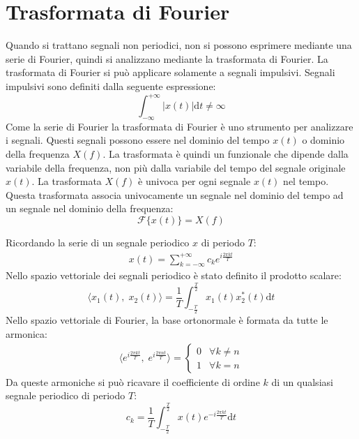 \documentclass{article}
\newcommand{\df}{\mathrm{d}}
\numberwithin{equation}{subsection}
\begin{document}
\section{Trasformata di Fourier}
Quando si trattano segnali non periodici, non si possono esprimere mediante una serie di Fourier, quindi si analizzano mediante la trasformata di Fourier. 
La trasformata di Fourier si può applicare solamente a segnali impulsivi. Segnali impulsivi sono definiti dalla seguente espressione:
\begin{equation*}
    \displaystyle\int_{-\infty}^{+\infty}|x(t)|\df t\neq\infty
\end{equation*}
Come la serie di Fourier la trasformata di Fourier è uno strumento per analizzare i segnali. Questi segnali possono essere nel dominio del tempo $x(t)$ o dominio 
della frequenza $X(f)$. La trasformata è quindi un funzionale che dipende dalla variabile della frequenza, non più dalla variabile del tempo del segnale originale $x(t)$. 
La trasformata $X(f)$ è univoca per ogni segnale $x(t)$ nel tempo. Questa trasformata associa univocamente un segnale nel dominio del tempo ad un segnale nel dominio della 
frequenza:   
\begin{equation*}
    \mathscr{F}\{x(t)\}=X(f)
\end{equation*}

Ricordando la serie di un segnale periodico $x$ di periodo $T$:
\begin{gather*}
    x(t)=\displaystyle\sum_{k=-\infty}^{+\infty}c_ke^{i\frac{2\pi kt}{T}}
\end{gather*}
Nello spazio vettoriale dei segnali periodico è stato definito il prodotto scalare:
\begin{equation*}
    \langle x_1(t),\;x_2(t)\rangle=\displaystyle\frac{1}{T}\int_{-\frac{T}{2}}^{\frac{T}{2}}x_1(t)x_2^*(t)\df t
\end{equation*}
Nello spazio vettoriale di Fourier, la base ortonormale è formata da tutte le armonica:
\begin{gather*}
    \langle e^{i\frac{2\pi kt}{T}},\;e^{i\frac{2\pi nt}{T}}\rangle=\begin{cases}
        0&\forall k\neq n\\
        1&\forall k=n
    \end{cases}
\end{gather*} 
Da queste armoniche si può ricavare il coefficiente di ordine $k$ di un qualsiasi segnale periodico di periodo $T$:
\begin{equation*}
    c_k=\displaystyle\frac{1}{T}\int_{-\frac{T}{2}}^{\frac{T}{2}}x(t)e^{-i\frac{2\pi kt}{T}}\df t
\end{equation*}
\end{document}
